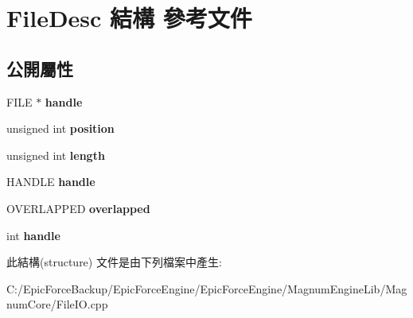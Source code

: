 \hypertarget{struct_file_desc}{}\section{File\+Desc 結構 參考文件}
\label{struct_file_desc}
\subsection*{公開屬性}
\begin{DoxyCompactItemize}
\item 
F\+I\+LE $\ast$ {\bfseries handle}\hypertarget{struct_file_desc_a0589c54b85c1d3e595f0c315cee2b357}{}\label{struct_file_desc_a0589c54b85c1d3e595f0c315cee2b357}

\item 
unsigned int {\bfseries position}\hypertarget{struct_file_desc_a96cb711cd8d450bc7592745a0b6b9113}{}\label{struct_file_desc_a96cb711cd8d450bc7592745a0b6b9113}

\item 
unsigned int {\bfseries length}\hypertarget{struct_file_desc_ab21834661d53d0ec4819e2a337410efc}{}\label{struct_file_desc_ab21834661d53d0ec4819e2a337410efc}

\item 
H\+A\+N\+D\+LE {\bfseries handle}\hypertarget{struct_file_desc_a6556ba3342ff8421c7955620f0de4ac1}{}\label{struct_file_desc_a6556ba3342ff8421c7955620f0de4ac1}

\item 
O\+V\+E\+R\+L\+A\+P\+P\+ED {\bfseries overlapped}\hypertarget{struct_file_desc_a4c2955ee06d3fa7893f55699015ad8fc}{}\label{struct_file_desc_a4c2955ee06d3fa7893f55699015ad8fc}

\item 
int {\bfseries handle}\hypertarget{struct_file_desc_a0589c54b85c1d3e595f0c315cee2b357}{}\label{struct_file_desc_a0589c54b85c1d3e595f0c315cee2b357}

\end{DoxyCompactItemize}


此結構(structure) 文件是由下列檔案中產生\+:\begin{DoxyCompactItemize}
\item 
C\+:/\+Epic\+Force\+Backup/\+Epic\+Force\+Engine/\+Epic\+Force\+Engine/\+Magnum\+Engine\+Lib/\+Magnum\+Core/File\+I\+O.\+cpp\end{DoxyCompactItemize}
